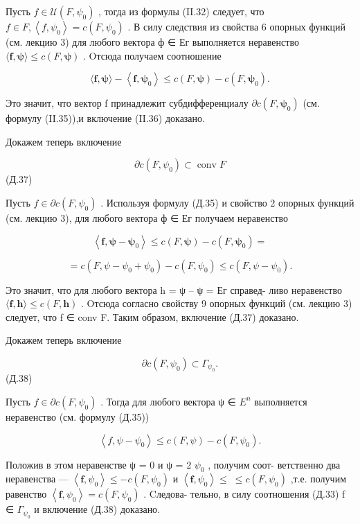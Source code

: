 \documentclass[8pt]{extarticle}
\begin{document}
Пусть \(f \in  \mathcal{U}\left( {F,{\psi }_{0}}\right)\) , тогда из формулы (II.32) следует, что \(f \in  F,\left\langle  {f,{\psi }_{0}}\right\rangle   = c\left( {F,{\psi }_{0}}\right)\) . В силу следствия из свойства 6 опорных функций (см. лекцию 3) для любого вектора ф ∈ Ег выполняется неравенство \(\langle \mathbf{f},\mathbf{\psi }\rangle  \leq  c\left( {F,\mathbf{\psi }}\right)\) . Oтсюда получаем соотношение

\[
\langle \mathbf{f},\mathbf{\psi }\rangle  - \left\langle  {\mathbf{f},{\mathbf{\psi }}_{0}}\right\rangle   \leq  c\left( {F,\mathbf{\psi }}\right)  - c\left( {F,{\mathbf{\psi }}_{0}}\right) .
\]

Это значит, что вектор f принадлежит субдифференциалу \(\partial c\left( {F,{\mathbf{\psi }}_{0}}\right)\) (см. формулу (II.35)),и включение (II.36) доказано.

Докажем теперь включение

\[
\partial c\left( {F,{\psi }_{0}}\right)  \subset  \operatorname{conv}F
\]
 (Д.37)

Пусть \(f \in  \partial c\left( {F,{\psi }_{0}}\right)\) . Используя формулу (Д.35) и свойство 2 опорных функций (см. лекцию 3), для любого вектора ф ∈ Ег получаем неравенство

\[
\left\langle  {\mathbf{f},\mathbf{\psi } - {\mathbf{\psi }}_{0}}\right\rangle   \leq  c\left( {F,\mathbf{\psi }}\right)  - c\left( {F,{\mathbf{\psi }}_{0}}\right)  =
\]

\[
= c\left( {F,\psi  - {\psi }_{0} + {\psi }_{0}}\right)  - c\left( {F,{\psi }_{0}}\right)  \leq  c\left( {F,\psi  - {\psi }_{0}}\right) .
\]

Это значит, что для любого вектора h = ψ – ψ = Ег справед- ливо неравенство \(\langle \mathbf{f},\mathbf{h}\rangle  \leq  c\left( {F,\mathbf{h}}\right)\) . Oтсюда согласно свойству 9 опорных функций (см. лекцию 3) следует, что f ∈ conv F. Таким образом, включение (Д.37) доказано.

Докажем теперь включение

\[
\partial c\left( {F,{\psi }_{0}}\right)  \subset  {\Gamma }_{{\psi }_{0}}.
\]
 (Д.38)

Пусть \(f \in  \partial c\left( {F,{\psi }_{0}}\right)\) . Тогда для любого вектора ψ ∈ \({E}^{n}\) выполняется неравенство (см. формулу (Д.35))

\[
\left\langle  {f,\psi  - {\psi }_{0}}\right\rangle   \leq  c\left( {F,\psi }\right)  - c\left( {F,{\psi }_{0}}\right) .
\]

Положив в этом неравенстве ψ = 0 и ψ = 2 \({\psi }_{0}\) , получим соот- ветственно два неравенства — \(\left\langle  {\mathbf{f},{\psi }_{0}}\right\rangle   \leq   - c\left( {F,{\psi }_{0}}\right)\) и \(\left\langle  {\mathbf{f},{\psi }_{0}}\right\rangle   \leq \; \leq  c\left( {F,{\psi }_{0}}\right)\) ,т.е. получим равенство \(\left\langle  {\mathbf{f},{\psi }_{0}}\right\rangle   = c\left( {F,{\psi }_{0}}\right)\) . Cледова- тельно, в силу соотношения (Д.33) f ∈ \({\Gamma }_{{\psi }_{0}}\) и включение (Д.38) доказано.
\end{document}

